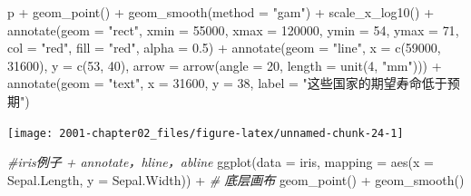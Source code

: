 \documentclass[
]{book}
\newenvironment{Shaded}{\begin{snugshade}}{\end{snugshade}}
\newcommand{\AttributeTok}[1]{\textcolor[rgb]{0.77,0.63,0.00}{#1}}
\newcommand{\CommentTok}[1]{\textcolor[rgb]{0.56,0.35,0.01}{\textit{#1}}}
\newcommand{\DecValTok}[1]{\textcolor[rgb]{0.00,0.00,0.81}{#1}}
\newcommand{\FloatTok}[1]{\textcolor[rgb]{0.00,0.00,0.81}{#1}}
\newcommand{\FunctionTok}[1]{\textcolor[rgb]{0.00,0.00,0.00}{#1}}
\newcommand{\NormalTok}[1]{#1}
\newcommand{\SpecialCharTok}[1]{\textcolor[rgb]{0.00,0.00,0.00}{#1}}
\newcommand{\StringTok}[1]{\textcolor[rgb]{0.31,0.60,0.02}{#1}}
\begin{document}
\begin{Shaded}
\begin{Highlighting}[]
\NormalTok{p }\SpecialCharTok{+} \FunctionTok{geom\_point}\NormalTok{() }\SpecialCharTok{+} \FunctionTok{geom\_smooth}\NormalTok{(}\AttributeTok{method =} \StringTok{"gam"}\NormalTok{) }\SpecialCharTok{+} \FunctionTok{scale\_x\_log10}\NormalTok{() }\SpecialCharTok{+} \FunctionTok{annotate}\NormalTok{(}\AttributeTok{geom =} \StringTok{"rect"}\NormalTok{, }
    \AttributeTok{xmin =} \DecValTok{55000}\NormalTok{, }\AttributeTok{xmax =} \DecValTok{120000}\NormalTok{, }\AttributeTok{ymin =} \DecValTok{54}\NormalTok{, }\AttributeTok{ymax =} \DecValTok{71}\NormalTok{, }\AttributeTok{col =} \StringTok{"red"}\NormalTok{, }\AttributeTok{fill =} \StringTok{"red"}\NormalTok{, }
    \AttributeTok{alpha =} \FloatTok{0.5}\NormalTok{) }\SpecialCharTok{+} \FunctionTok{annotate}\NormalTok{(}\AttributeTok{geom =} \StringTok{"line"}\NormalTok{, }\AttributeTok{x =} \FunctionTok{c}\NormalTok{(}\DecValTok{59000}\NormalTok{, }\DecValTok{31600}\NormalTok{), }\AttributeTok{y =} \FunctionTok{c}\NormalTok{(}\DecValTok{53}\NormalTok{, }\DecValTok{40}\NormalTok{), }\AttributeTok{arrow =} \FunctionTok{arrow}\NormalTok{(}\AttributeTok{angle =} \DecValTok{20}\NormalTok{, }
    \AttributeTok{length =} \FunctionTok{unit}\NormalTok{(}\DecValTok{4}\NormalTok{, }\StringTok{"mm"}\NormalTok{))) }\SpecialCharTok{+} \FunctionTok{annotate}\NormalTok{(}\AttributeTok{geom =} \StringTok{"text"}\NormalTok{, }\AttributeTok{x =} \DecValTok{31600}\NormalTok{, }\AttributeTok{y =} \DecValTok{38}\NormalTok{, }\AttributeTok{label =} \StringTok{"这些国家的期望寿命低于预期"}\NormalTok{)}
\end{Highlighting}
\end{Shaded}

\begin{center}\texttt{[image: 2001-chapter02\_files/figure-latex/unnamed-chunk-24-1]} \end{center}

\begin{Shaded}
\begin{Highlighting}[]
\CommentTok{\#iris例子 + annotate，hline，abline}
\FunctionTok{ggplot}\NormalTok{(}\AttributeTok{data =}\NormalTok{ iris, }\AttributeTok{mapping =} \FunctionTok{aes}\NormalTok{(}\AttributeTok{x =}\NormalTok{ Sepal.Length, }\AttributeTok{y =}\NormalTok{ Sepal.Width)) }\SpecialCharTok{+}  \CommentTok{\# 底层画布}
  \FunctionTok{geom\_point}\NormalTok{() }\SpecialCharTok{+}
  \FunctionTok{geom\_smooth}\NormalTok{() }
\end{Highlighting}
\end{Shaded}
\end{document}
